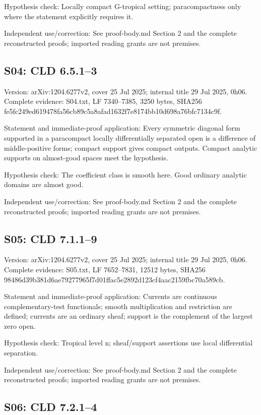 \documentclass[11pt]{article}
\begin{document}
Hypothesis check: Locally compact G-tropical setting; paracompactness only where the statement explicitly requires it.

Independent use/correction: See proof-body.md Section 2 and the complete reconstructed proofs; imported reading grants are not premises.

\subsection{S04: CLD 6.5.1--3}

Version: arXiv:1204.6277v2, cover 25 Jul 2025; internal title 29 Jul 2025, 0h06. Complete evidence: S04.txt, LF 7340--7385, 3250 bytes, SHA256 fe5fc249ed619478fa56cb89c5a8afad1632f7e8174bb10d698a76bfc7134c9f.

Statement and immediate-proof application: Every symmetric diagonal form supported in a paracompact locally differentially separated open is a difference of middle-positive forms; compact support gives compact outputs. Compact analytic supports on almost-good spaces meet the hypothesis.

Hypothesis check: The coefficient class is smooth here. Good ordinary analytic domains are almost good.

Independent use/correction: See proof-body.md Section 2 and the complete reconstructed proofs; imported reading grants are not premises.

\subsection{S05: CLD 7.1.1--9}

Version: arXiv:1204.6277v2, cover 25 Jul 2025; internal title 29 Jul 2025, 0h06. Complete evidence: S05.txt, LF 7652--7831, 12512 bytes, SHA256 98486d39b381d6ae79277965f7d01ffac5e2892d123cf4aac2159fbc70a589cb.

Statement and immediate-proof application: Currents are continuous complementary-test functionals; smooth multiplication and restriction are defined; currents are an ordinary sheaf; support is the complement of the largest zero open.

Hypothesis check: Tropical level n; sheaf/support assertions use local differential separation.

Independent use/correction: See proof-body.md Section 2 and the complete reconstructed proofs; imported reading grants are not premises.

\subsection{S06: CLD 7.2.1--4}
\end{document}

